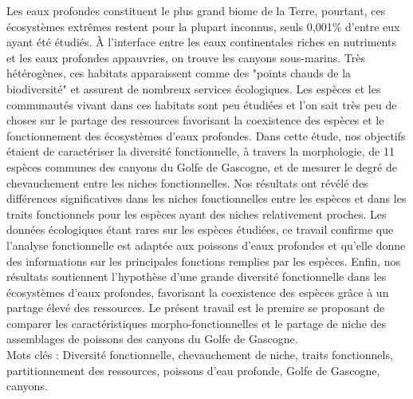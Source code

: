 Les eaux profondes constituent le plus grand biome de la Terre, pourtant, ces écosystèmes extrêmes restent pour la plupart inconnus, seuls 0,001\% d'entre eux ayant été étudiés. À l'interface entre les eaux continentales riches en nutriments et les eaux profondes appauvries, on trouve les canyons sous-marins. Très hétérogènes, ces habitats apparaissent comme des "points chauds de la biodiversité" et assurent de nombreux services écologiques. Les espèces et les communautés vivant dans ces habitats sont peu étudiées et l'on sait très peu de choses sur le partage des ressources favorisant la coexistence des espèces et le fonctionnement des écosystèmes d'eaux profondes. Dans cette étude, nos objectifs étaient de caractériser la diversité fonctionnelle, à travers la morphologie, de 11 espèces communes des canyons du Golfe de Gascogne, et de mesurer le degré de chevauchement entre les niches fonctionnelles. Nos résultats ont révélé des différences significatives dans les niches fonctionnelles entre les espèces et dans les traits fonctionnels pour les espèces ayant des niches relativement proches. Les données écologiques étant rares sur les espèces étudiées, ce travail confirme que l'analyse fonctionnelle est adaptée aux poissons d'eaux profondes et qu'elle donne des informations sur les principales fonctions remplies par les espèces. Enfin, nos résultats soutiennent l'hypothèse d'une grande diversité fonctionnelle dans les écosystèmes d'eaux profondes, favorisant la coexistence des espèces grâce à un partage élevé des ressources. Le présent travail est le premire se proposant de comparer les caractéristiques morpho-fonctionnelles et le partage de niche des assemblages de poissons des canyons du Golfe de Gascogne.\\

Mots clés : Diversité fonctionnelle, chevauchement de niche, traits fonctionnels, partitionnement des ressources, poissons d'eau profonde, Golfe de Gascogne, canyons.